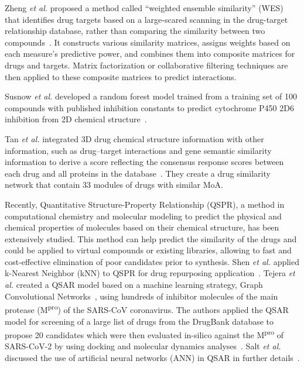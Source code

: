 \documentclass[Minh_PhD_thesis.tex]{subfiles}
\begin{document}
Zheng \textit{et al.} proposed a method called ``weighted ensemble similarity'' (WES) that identifies drug targets based on a large-scared scanning in the drug-target relationship database, rather than comparing the similarity between two compounds~\cite{zheng2015large}.  It constructs various similarity matrices, assigns weights based on each measure’s predictive power, and combines them into composite matrices for drugs and targets. Matrix factorization or collaborative filtering techniques are then applied to these composite matrices to predict interactions. 

Susnow \textit{et al.} developed a random forest model trained from a training set of 100 compounds with published inhibition constants to predict cytochrome P450 2D6 inhibition from 2D chemical structure~\cite{susnow2003use}.

Tan \textit{et al.} integrated 3D drug chemical structure information with other information, such as drug–target interactions
and gene semantic similarity information to derive a score reflecting the consensus response scores between each drug and all proteins in the database~\cite{tan2014drug}. They create a drug similarity network that contain 33 modules of drugs with similar MoA.

Recently, Quantitative Structure-Property Relationship (QSPR), a method in computational chemistry and molecular modeling to predict the physical and chemical properties of molecules based on their chemical structure, has been extensively studied. This method can help predict the similarity of the drugs and could be applied to virtual compounds or
existing libraries, allowing to fast and cost-effective elimination of poor candidates prior to synthesis. Shen \textit{et al.} applied k-Nearest Neighbor (kNN) to QSPR for drug repurposing application~\cite{shen2003development}. Tejera \textit{et al.} created a QSAR model based on a machine learning strategy, Graph Convolutional Networks~\cite{duvenaud2015convolutional}, using hundreds of inhibitor molecules of the main protease (M\textsuperscript{pro}) of the SARS-CoV coronavirus. The authors applied the QSAR model for screening of a large list of drugs from the DrugBank database to propose 20 candidates which were then evaluated in-silico against the M\textsuperscript{pro} of SARS-CoV-2 by using docking and molecular dynamics analyses~\cite{tejera2020drugs}.
Salt \textit{et al.} discussed the use of artificial neural networks (ANN) in QSAR in further details~\cite{salt1992use}.
\end{document}
